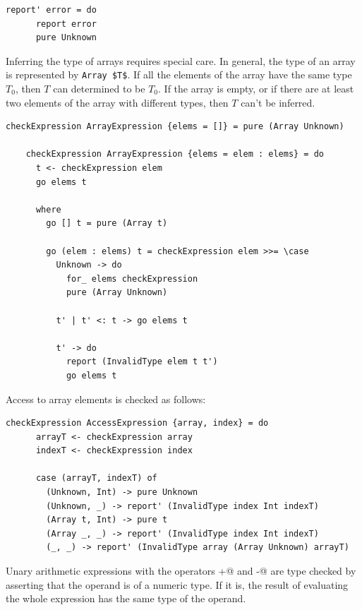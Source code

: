 \documentclass[UdineBachThesis,american,11pt]{PhdThesis}
\begin{document}
  \begin{lstlisting}[gobble=4,basicstyle=\ttfamily\small]
    report' error = do
      report error
      pure Unknown
  \end{lstlisting}

  Inferring the type of arrays requires special care. In general, the type of an
  array is represented by \lstinline[mathescape]@Array $T$@. If all the elements
  of the array have the same type $T_0$, then $T$ can determined to be $T_0$. If
  the array is empty, or if there are at least two elements of the array with
  different types, then $T$ can't be inferred.

  \begin{lstlisting}[gobble=4,basicstyle=\ttfamily\small]
    checkExpression ArrayExpression {elems = []} = pure (Array Unknown)

    checkExpression ArrayExpression {elems = elem : elems} = do
      t <- checkExpression elem
      go elems t

      where
        go [] t = pure (Array t)

        go (elem : elems) t = checkExpression elem >>= \case
          Unknown -> do
            for_ elems checkExpression
            pure (Array Unknown)

          t' | t' <: t -> go elems t

          t' -> do
            report (InvalidType elem t t')
            go elems t
  \end{lstlisting}

  Access to array elements is checked as follows:

  \begin{lstlisting}[gobble=4,basicstyle=\ttfamily\small]
    checkExpression AccessExpression {array, index} = do
      arrayT <- checkExpression array
      indexT <- checkExpression index

      case (arrayT, indexT) of
        (Unknown, Int) -> pure Unknown
        (Unknown, _) -> report' (InvalidType index Int indexT)
        (Array t, Int) -> pure t
        (Array _, _) -> report' (InvalidType index Int indexT)
        (_, _) -> report' (InvalidType array (Array Unknown) arrayT)
  \end{lstlisting}

  Unary arithmetic expressions with the operators \lstinline@+@ and
  \lstinline@-@ are type checked by asserting that the operand is of a numeric
  type. If it is, the result of evaluating the whole expression has the same
  type of the operand.
\end{document}
